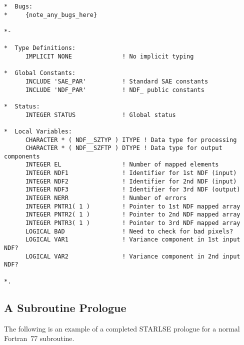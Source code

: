 \begin{verbatim}
*  Bugs:
*     {note_any_bugs_here}

*-

*  Type Definitions:
      IMPLICIT NONE              ! No implicit typing

*  Global Constants:
      INCLUDE 'SAE_PAR'          ! Standard SAE constants
      INCLUDE 'NDF_PAR'          ! NDF_ public constants

*  Status:
      INTEGER STATUS             ! Global status

*  Local Variables:
      CHARACTER * ( NDF__SZTYP ) ITYPE ! Data type for processing
      CHARACTER * ( NDF__SZFTP ) DTYPE ! Data type for output components
      INTEGER EL                 ! Number of mapped elements
      INTEGER NDF1               ! Identifier for 1st NDF (input)
      INTEGER NDF2               ! Identifier for 2nd NDF (input)
      INTEGER NDF3               ! Identifier for 3rd NDF (output)
      INTEGER NERR               ! Number of errors
      INTEGER PNTR1( 1 )         ! Pointer to 1st NDF mapped array
      INTEGER PNTR2( 1 )         ! Pointer to 2nd NDF mapped array
      INTEGER PNTR3( 1 )         ! Pointer to 3rd NDF mapped array
      LOGICAL BAD                ! Need to check for bad pixels?
      LOGICAL VAR1               ! Variance component in 1st input NDF?
      LOGICAL VAR2               ! Variance component in 2nd input NDF?

*.
\end{verbatim}
\normalsize

\subsection{A Subroutine Prologue}

The following is an example of a completed STARLSE prologue for a normal
Fortran~77 subroutine.

